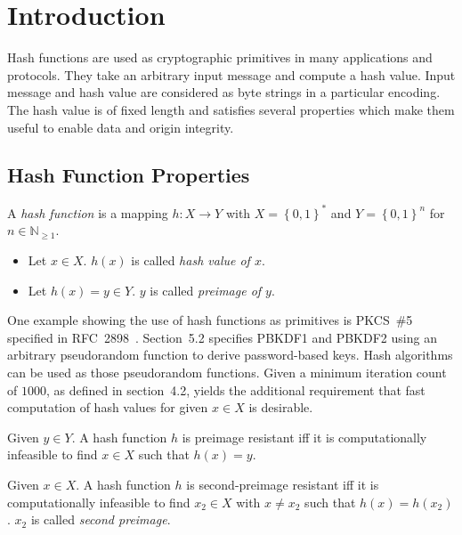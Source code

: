 \chapter{Introduction}
\label{ch:introduction}
%
Hash functions are used as cryptographic primitives in many applications and protocols.
They take an arbitrary input message and compute a hash value. Input message and hash value
are considered as byte strings in a particular encoding.
The hash value is of fixed length and satisfies several properties which make them useful
to enable data and origin integrity.

\section{Hash Function Properties}
\label{ch:hf-properties}
%
\begin{defi}
  A \emph{hash function} is a mapping $h: X \to Y$ with $X = \left\{0,1\right\}^*$ and
  $Y = \left\{0,1\right\}^n$ for $n \in \mathbb N_{\geq 1}$.
  \begin{itemize}\itemsep0pt
    \item Let $x \in X$. $h(x)$ is called \emph{hash value of $x$}.
    \item Let $h(x) = y \in Y$. $y$ is called \emph{preimage of $y$}.
  \end{itemize}
\end{defi}

One example showing the use of hash functions as primitives is PKCS~\#5
specified in RFC~2898~\cite{rfc2898}. Section~5.2 specifies PBKDF1 and PBKDF2
using an arbitrary pseudorandom function to derive password-based keys.
Hash algorithms can be used as those pseudorandom functions.
Given a minimum iteration count of $1000$, as defined in section~4.2,
yields the additional requirement that fast computation of hash values
for given $x \in X$ is desirable.

\begin{defi}
  Given $y \in Y$.
  A hash function $h$ is preimage resistant iff it is computationally infeasible
  to find $x \in X$ such that $h(x) = y$.
\end{defi}

\begin{defi}
  Given $x \in X$.
  A hash function $h$ is second-preimage resistant iff it is computationally infeasible
  to find $x_2 \in X$ with $x \neq x_2$ such that $h(x) = h(x_2)$.
  $x_2$ is called \emph{second preimage}.
\end{defi}

